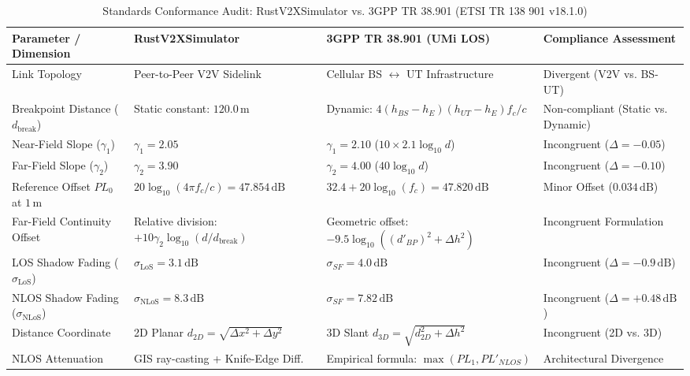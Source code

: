 \documentclass[11pt,a4paper]{article}
\begin{document}
\begin{table}[t]
\centering
\small
\caption{Standards Conformance Audit: RustV2XSimulator vs. 3GPP TR 38.901 (ETSI TR 138 901 v18.1.0)}
\label{tab:compliance_matrix}
\begin{tabular}{@{}p{3.5cm}p{4.0cm}p{4.6cm}p{3.4cm}@{}}
\toprule
\textbf{Parameter / Dimension} & \textbf{RustV2XSimulator} & \textbf{3GPP TR 38.901 (UMi LOS)} & \textbf{Compliance Assessment} \\
\midrule
Link Topology & Peer-to-Peer V2V Sidelink & Cellular BS $\leftrightarrow$ UT Infrastructure & Divergent (V2V vs. BS-UT) \\
Breakpoint Distance ($d_{\text{break}}$) & Static constant: $120.0\,\text{m}$ & Dynamic: $4 (h_{BS} - h_E)(h_{UT} - h_E) f_c / c$ & Non-compliant (Static vs. Dynamic) \\
Near-Field Slope ($\gamma_1$) & $\gamma_1 = 2.05$ & $\gamma_1 = 2.10$ ($10 \times 2.1 \log_{10} d$) & Incongruent ($\Delta = -0.05$) \\
Far-Field Slope ($\gamma_2$) & $\gamma_2 = 3.90$ & $\gamma_2 = 4.00$ ($40 \log_{10} d$) & Incongruent ($\Delta = -0.10$) \\
Reference Offset $PL_0$ at $1\,\text{m}$ & $20 \log_{10}(4\pi f_c / c) = 47.854\,\text{dB}$ & $32.4 + 20 \log_{10}(f_c) = 47.820\,\text{dB}$ & Minor Offset ($0.034\,\text{dB}$) \\
Far-Field Continuity Offset & Relative division: $+10 \gamma_2 \log_{10}(d / d_{\text{break}})$ & Geometric offset: $-9.5 \log_{10}((d'_{BP})^2 + \Delta h^2)$ & Incongruent Formulation \\
LOS Shadow Fading ($\sigma_{\text{LoS}}$) & $\sigma_{\text{LoS}} = 3.1\,\text{dB}$ & $\sigma_{SF} = 4.0\,\text{dB}$ & Incongruent ($\Delta = -0.9\,\text{dB}$) \\
NLOS Shadow Fading ($\sigma_{\text{NLoS}}$) & $\sigma_{\text{NLoS}} = 8.3\,\text{dB}$ & $\sigma_{SF} = 7.82\,\text{dB}$ & Incongruent ($\Delta = +0.48\,\text{dB}$) \\
Distance Coordinate & 2D Planar $d_{2D} = \sqrt{\Delta x^2 + \Delta y^2}$ & 3D Slant $d_{3D} = \sqrt{d_{2D}^2 + \Delta h^2}$ & Incongruent (2D vs. 3D) \\
NLOS Attenuation & GIS ray-casting + Knife-Edge Diff. & Empirical formula: $\max(PL_1, PL'_{NLOS})$ & Architectural Divergence \\
\bottomrule
\end{tabular}
\end{table}
\end{document}
